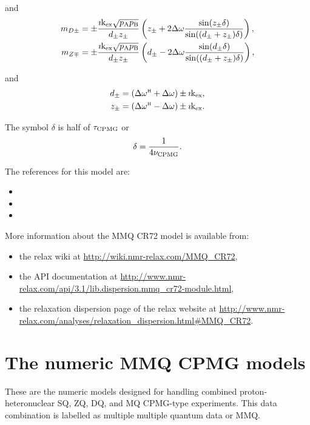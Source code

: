 and
\begin{align}
    m_{D\pm} &= \pm \frac{\imath\textrm{k}_\textrm{ex}\sqrt{p_\textrm{A}p_\textrm{B}}}{d_\pm z_\pm} \left( z_\pm + 2\Delta\omega \frac{\sin(z_\pm\delta)}{\sin((d_\pm + z_\pm)\delta)} \right), \\
    m_{Z\mp} &= \pm \frac{\imath\textrm{k}_\textrm{ex}\sqrt{p_\textrm{A}p_\textrm{B}}}{d_\pm z_\pm} \left( d_\pm - 2\Delta\omega \frac{\sin(d_\pm\delta)}{\sin((d_\pm + z_\pm)\delta)} \right),
\end{align}

and
\begin{align}
    d_\pm    &= \left( \Delta\omega^{\scriptscriptstyle\mathrm{H}} + \Delta\omega \right) \pm \imath\textrm{k}_\textrm{ex}, \\
    z_\pm    &= \left( \Delta\omega^{\scriptscriptstyle\mathrm{H}} - \Delta\omega \right) \pm \imath\textrm{k}_\textrm{ex}.
\end{align}

The symbol $\delta$ is half of $\tau_\textrm{CPMG}$ or
\begin{equation}
    \delta = \frac{1}{4\nu_\textrm{CPMG}}.
\end{equation}

The references for this model are:
\begin{itemize}
  \item {}
  \item {}
  \item {}
\end{itemize}

More information about the MMQ CR72 model is available from:
\begin{itemize}
  \item the relax wiki at \url{http://wiki.nmr-relax.com/MMQ\_CR72},
  \item the API documentation at \url{http://www.nmr-relax.com/api/3.1/lib.dispersion.mmq\_cr72-module.html},
  \item the relaxation dispersion page of the relax website at \url{http://www.nmr-relax.com/analyses/relaxation\_dispersion.html#MMQ\_CR72}.
\end{itemize}




\section{The numeric MMQ CPMG models}
\label{sect: dispersion: numeric MMQ CPMG models}

These are the numeric models designed for handling combined proton-heteronuclear SQ, ZQ, DQ, and MQ CPMG-type experiments.
This data combination is labelled as multiple multiple quantum data or MMQ.


